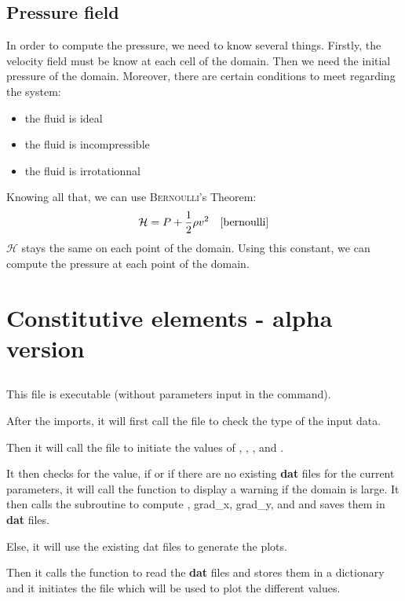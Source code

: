 \subsection{Pressure field}
In order to compute the pressure, we need to know several things. Firstly, the
velocity field must be know at each cell of the domain. Then we need the
initial pressure of the domain. Moreover, there are certain conditions to meet
regarding the system:

\begin{itemize}[noitemsep]
      \item the fluid is ideal
      \item the fluid is incompressible
      \item the fluid is irrotationnal
\end{itemize}
Knowing all that, we can use \textsc{Bernoulli}'s Theorem:
\[
      \mathcal{H} = P + \dfrac{1}{2} \rho v^2 \quad \text{\cite{bernoulli}}
\]
$\mathcal{H}$ stays the same on each point of the domain. Using this constant,
we can compute the pressure at each point of the domain.

\section{Constitutive elements - alpha version}
\subsection{}
This file is executable (without parameters input in the command).

After the imports, it will first call the file  to check the
type of the input data.

Then it will call the file  to initiate
the values of , , ,  and .

It then checks for the  value, if  or if there are no
existing \textbf{dat} files for the current parameters, it will call
the function  to display a warning if the domain is large.
It then calls the subroutine  to compute ,
grad\_x, grad\_y,  and  and saves them in
\textbf{dat} files.

Else, it will use the existing dat files to generate the plots.

Then it calls the function  to read the \textbf{dat} files and
stores them in a dictionary and it initiates the file  which will be
used to plot the different values.

